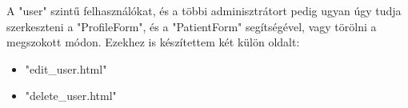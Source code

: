 A "user" szintű felhasználókat, és a többi adminisztrátort pedig ugyan úgy tudja szerkeszteni a "ProfileForm", és a "PatientForm" segítségével, vagy törölni a megszokott módon. Ezekhez is készítettem két külön oldalt:

\begin{itemize}
	\item "edit\_user.html"
	\item "delete\_user.html"
\end{itemize}
